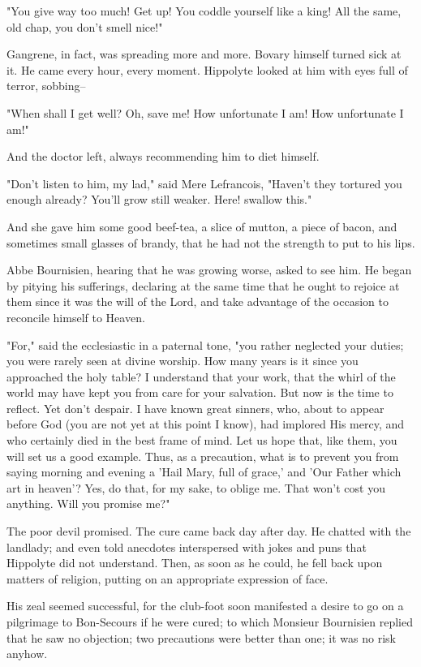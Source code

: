 \documentclass[11pt,twocolumn]{ltugboat}
\begin{document}
"You give way too much! Get up! You coddle yourself like a king! All the
same, old chap, you don't smell nice!"

Gangrene, in fact, was spreading more and more. Bovary himself turned
sick at it. He came every hour, every moment. Hippolyte looked at him
with eyes full of terror, sobbing--

"When shall I get well? Oh, save me! How unfortunate I am! How
unfortunate I am!"

And the doctor left, always recommending him to diet himself.

"Don't listen to him, my lad," said Mere Lefrancois, "Haven't they
tortured you enough already? You'll grow still weaker. Here! swallow
this."

And she gave him some good beef-tea, a slice of mutton, a piece of
bacon, and sometimes small glasses of brandy, that he had not the
strength to put to his lips.

Abbe Bournisien, hearing that he was growing worse, asked to see him.
He began by pitying his sufferings, declaring at the same time that he
ought to rejoice at them since it was the will of the Lord, and take
advantage of the occasion to reconcile himself to Heaven.

"For," said the ecclesiastic in a paternal tone, "you rather neglected
your duties; you were rarely seen at divine worship. How many years is
it since you approached the holy table? I understand that your work,
that the whirl of the world may have kept you from care for your
salvation. But now is the time to reflect. Yet don't despair. I have
known great sinners, who, about to appear before God (you are not yet
at this point I know), had implored His mercy, and who certainly died in
the best frame of mind. Let us hope that, like them, you will set us a
good example. Thus, as a precaution, what is to prevent you from saying
morning and evening a 'Hail Mary, full of grace,' and 'Our Father which
art in heaven'? Yes, do that, for my sake, to oblige me. That won't cost
you anything. Will you promise me?"

The poor devil promised. The cure came back day after day. He chatted
with the landlady; and even told anecdotes interspersed with jokes and
puns that Hippolyte did not understand. Then, as soon as he could, he
fell back upon matters of religion, putting on an appropriate expression
of face.

His zeal seemed successful, for the club-foot soon manifested a desire
to go on a pilgrimage to Bon-Secours if he were cured; to which Monsieur
Bournisien replied that he saw no objection; two precautions were better
than one; it was no risk anyhow.
\end{document}
